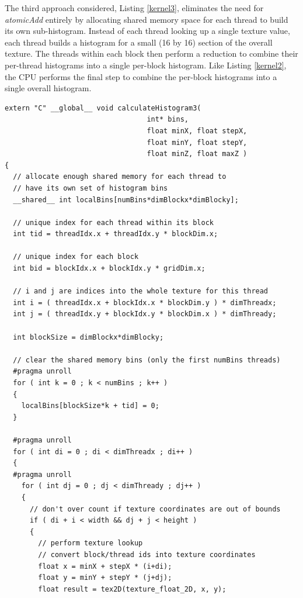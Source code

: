 \documentclass{article}
\begin{document}
The third approach considered, Listing \ref{kernel3}, eliminates the need for \emph{atomicAdd} entirely by allocating shared memory space for each thread to build its own sub-histogram. Instead of each thread looking up a single texture value, each thread builds a histogram for a small (16 by 16) section of the overall texture. The threads within each block then perform a reduction to combine their per-thread histograms into a single per-block histogram\cite{tree-reduction}. Like Listing \ref{kernel2}, the CPU performs the final step to combine the per-block histograms into a single overall histogram.

\lstset{language=C,basicstyle=\footnotesize}
\begin{lstlisting}[caption={calculateHistogram3: Per-Thread Sub-Histograms},label={kernel3}]
extern "C" __global__ void calculateHistogram3(
                                  int* bins,
                                  float minX, float stepX,
                                  float minY, float stepY,
                                  float minZ, float maxZ )
{
  // allocate enough shared memory for each thread to
  // have its own set of histogram bins
  __shared__ int localBins[numBins*dimBlockx*dimBlocky];

  // unique index for each thread within its block
  int tid = threadIdx.x + threadIdx.y * blockDim.x;

  // unique index for each block
  int bid = blockIdx.x + blockIdx.y * gridDim.x;

  // i and j are indices into the whole texture for this thread
  int i = ( threadIdx.x + blockIdx.x * blockDim.y ) * dimThreadx;
  int j = ( threadIdx.y + blockIdx.y * blockDim.x ) * dimThready;

  int blockSize = dimBlockx*dimBlocky;

  // clear the shared memory bins (only the first numBins threads)
  #pragma unroll
  for ( int k = 0 ; k < numBins ; k++ ) 
  {
    localBins[blockSize*k + tid] = 0;
  }

  #pragma unroll
  for ( int di = 0 ; di < dimThreadx ; di++ )
  {
  #pragma unroll
    for ( int dj = 0 ; dj < dimThready ; dj++ )
    {
      // don't over count if texture coordinates are out of bounds
      if ( di + i < width && dj + j < height )
      {
        // perform texture lookup
        // convert block/thread ids into texture coordinates
        float x = minX + stepX * (i+di);
        float y = minY + stepY * (j+dj);
        float result = tex2D(texture_float_2D, x, y);


\end{lstlisting}
\end{document}

